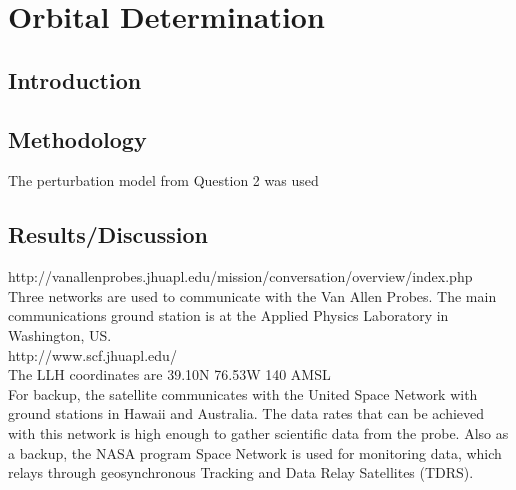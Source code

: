 \documentclass[Space3_Assign1.tex]{subfiles}
\begin{document}
\section{Orbital Determination}

\subsection{Introduction}

\subsection{Methodology}
The perturbation model from Question 2 was used
\subsection{Results/Discussion}
http://vanallenprobes.jhuapl.edu/mission/conversation/overview/index.php\\
Three networks are used to communicate with the Van Allen Probes. The main communications ground station is at the Applied Physics Laboratory in Washington, US.\\
http://www.scf.jhuapl.edu/\\
The LLH coordinates are 39.10N 76.53W 140 AMSL\\
For backup, the satellite communicates with the United Space Network with ground stations in Hawaii and Australia. The data rates that can be achieved with this network is high enough to gather scientific data from the probe. Also as a backup, the NASA program Space Network is used for monitoring data, which relays through geosynchronous Tracking and Data Relay Satellites (TDRS).
\end{document}
